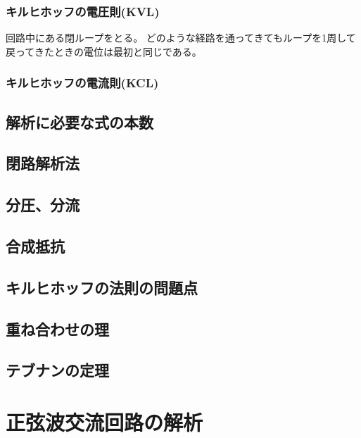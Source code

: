 \documentclass{ltjsreport}
\begin{document}
\subsubsection{キルヒホッフの電圧則(KVL)}
回路中にある閉ループをとる。
どのような経路を通ってきてもループを1周して戻ってきたときの電位は最初と同じである。


\subsubsection{キルヒホッフの電流則(KCL)}




\subsection{解析に必要な式の本数}

\subsection{閉路解析法}

\subsection{分圧、分流}

\subsection{合成抵抗}

\subsection{キルヒホッフの法則の問題点}

\subsection{重ね合わせの理}

\subsection{テブナンの定理}















\section{正弦波交流回路の解析}
\end{document}

